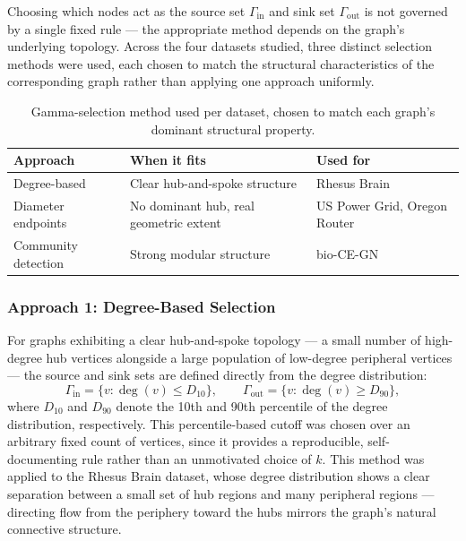 \documentclass[a4paper,12pt]{amsart}
\numberwithin{equation}{section}
\begin{document}
Choosing which nodes act as the source set $\Gamma_{\text{in}}$ and 
sink set $\Gamma_{\text{out}}$ is not governed by a single fixed rule — 
the appropriate method depends on the graph's underlying topology. 
Across the four datasets studied, three distinct selection methods were 
used, each chosen to match the structural characteristics of the 
corresponding graph rather than applying one approach uniformly.

\begin{table}[h]
\centering
\begin{tabular}{|l|l|l|}
\hline
\textbf{Approach} & \textbf{When it fits} & \textbf{Used for} \\
\hline
Degree-based & Clear hub-and-spoke structure & Rhesus Brain \\
\hline
Diameter endpoints & No dominant hub, real geometric extent & US Power Grid, Oregon Router \\
\hline
Community detection & Strong modular structure & bio-CE-GN \\
\hline
\end{tabular}
\caption{Gamma-selection method used per dataset, chosen to match each graph's dominant structural property.}
\label{tab:gamma_methods}
\end{table}

\subsubsection{Approach 1: Degree-Based Selection}

For graphs exhibiting a clear hub-and-spoke topology — a small number 
of high-degree hub vertices alongside a large population of low-degree 
peripheral vertices — the source and sink sets are defined directly 
from the degree distribution:
\begin{equation}
\Gamma_{\text{in}} = \{v : \deg(v) \leq D_{10}\}, \qquad
\Gamma_{\text{out}} = \{v : \deg(v) \geq D_{90}\},
\end{equation}
where $D_{10}$ and $D_{90}$ denote the 10th and 90th percentile of the 
degree distribution, respectively. This percentile-based cutoff was 
chosen over an arbitrary fixed count of vertices, since it provides a 
reproducible, self-documenting rule rather than an unmotivated choice 
of $k$. This method was applied to the Rhesus Brain dataset, whose 
degree distribution shows a clear separation between a small set of 
hub regions and many peripheral regions — directing flow from the 
periphery toward the hubs mirrors the graph's natural connective 
structure.
\end{document}
